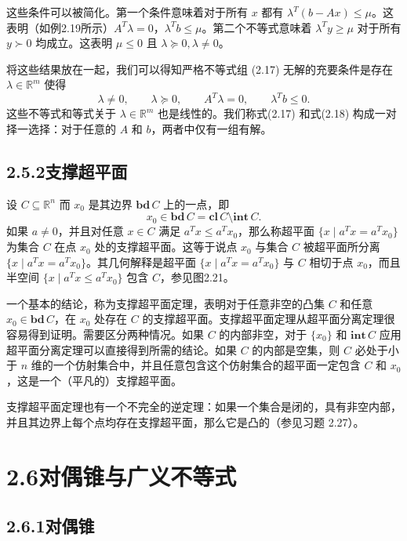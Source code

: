 \documentclass[UTF8, 12pt, fontset=fandol, oneside]{ctexart}
\begin{document}
这些条件可以被简化。第一个条件意味着对于所有 $x$ 都有 $\lambda^T(b-Ax)\le\mu$。这表明（如例2.19所示）$A^T\lambda=0$，$\lambda^Tb\le\mu$。第二个不等式意味着 $\lambda^Ty\ge\mu$ 对于所有 $y\succ0$ 均成立。这表明 $\mu\le0$ 且 $\lambda\succeq0,\lambda\ne0$。

将这些结果放在一起，我们可以得知严格不等式组 (2.17) 无解的充要条件是存在 $\lambda\in\mathbb{R}^m$ 使得
\begin{equation}
  \lambda\ne0,\qquad \lambda\succeq0,\qquad A^T\lambda=0,\qquad \lambda^Tb\le0.
  \tag{2.18}
\end{equation}
这些不等式和等式关于 $\lambda\in\mathbb{R}^m$ 也是线性的。我们称式(2.17) 和式(2.18) 构成一对择一选择：对于任意的 $A$ 和 $b$，两者中仅有一组有解。

\subsection*{2.5.2\quad 支撑超平面}

设 $C\subseteq\mathbb{R}^n$ 而 $x_0$ 是其边界 $\mathbf{bd}\,C$ 上的一点，即
\[
  x_0\in\mathbf{bd}\,C=\mathbf{cl}\,C\setminus\mathbf{int}\,C.
\]
如果 $a\ne0$，并且对任意 $x\in C$ 满足 $a^Tx\le a^Tx_0$，那么称超平面 $\{x\mid a^Tx=a^Tx_0\}$ 为集合 $C$ 在点 $x_0$ 处的支撑超平面。这等于说点 $x_0$ 与集合 $C$ 被超平面所分离 $\{x\mid a^Tx=a^Tx_0\}$。其几何解释是超平面 $\{x\mid a^Tx=a^Tx_0\}$ 与 $C$ 相切于点 $x_0$，而且半空间 $\{x\mid a^Tx\le a^Tx_0\}$ 包含 $C$，参见图2.21。

一个基本的结论，称为支撑超平面定理，表明对于任意非空的凸集 $C$ 和任意 $x_0\in\mathbf{bd}\,C$，在 $x_0$ 处存在 $C$ 的支撑超平面。支撑超平面定理从超平面分离定理很容易得到证明。需要区分两种情况。如果 $C$ 的内部非空，对于 $\{x_0\}$ 和 $\mathbf{int}\,C$ 应用超平面分离定理可以直接得到所需的结论。如果 $C$ 的内部是空集，则 $C$ 必处于小于 $n$ 维的一个仿射集合中，并且任意包含这个仿射集合的超平面一定包含 $C$ 和 $x_0$，这是一个（平凡的）支撑超平面。

支撑超平面定理也有一个不完全的逆定理：如果一个集合是闭的，具有非空内部，并且其边界上每个点均存在支撑超平面，那么它是凸的（参见习题 2.27）。

\section*{2.6\quad 对偶锥与广义不等式}

\subsection*{2.6.1\quad 对偶锥}
\end{document}
